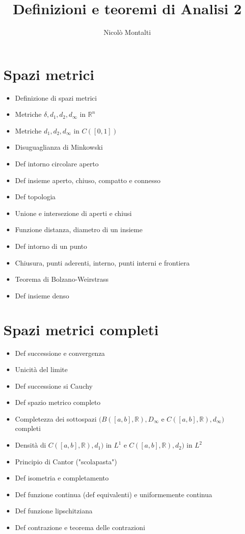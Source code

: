 \documentclass[10pt,a4paper, twocolumn]{article}
\title{Definizioni e teoremi di Analisi 2}
\author{Nicolò Montalti}
\date{}
\newcommand{\R}{\mathbb{R}}
\renewcommand{\,}{\text{, }}
\begin{document}
\maketitle

\section{Spazi metrici}
\begin{itemize}
    \item Definizione di spazi metrici
    \item Metriche $\delta, d_1, d_2, d_{\infty}$ in $\R^n$
    \item Metriche $d_1, d_2, d_{\infty}$ in $C([0,1])$
    \item Disuguaglianza di Minkowski
    \item Def intorno circolare aperto
    \item Def insieme aperto, chiuso, compatto e connesso
    \item Def topologia
    \item Unione e intersezione di aperti e chiusi
    \item Funzione distanza, diametro di un insieme
    \item Def intorno di un punto
    \item Chiusura, punti aderenti, interno, punti interni e frontiera
    \item Teorema di Bolzano-Weirstrass
    \item Def insieme denso
\end{itemize}

\section{Spazi metrici completi}
\begin{itemize}
    \item Def successione e convergenza
    \item Unicità del limite
    \item Def successione si Cauchy
    \item Def spazio metrico completo
    \item Completezza dei sottospazi $(B([a,b],\R), D_{\infty}$ e $C([a,b],\R), d_{\infty})$ completi
    \item Densità di $C([a,b],\R), d_1)$ in $L^1$ e $C([a,b],\R), d_2)$ in $L^2$
    \item Principio di Cantor ("scolapasta")
    \item Def isometria e completamento 
    \item Def funzione continua (def equivalenti) e uniformemente continua
    \item Def funzione lipschitziana
    \item Def contrazione e teorema delle contrazioni
\end{itemize}
\end{document}
